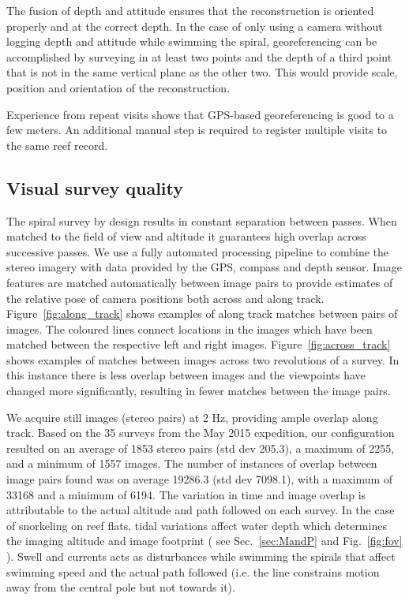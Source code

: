 The fusion of depth and attitude ensures that the reconstruction is oriented properly and at the correct depth. In the case of only using a camera without logging depth and attitude while swimming the spiral, georeferencing can be accomplished by surveying in at least two points and the depth of a third point that is not in the same vertical plane as the other two. This would provide scale, position and orientation of the reconstruction.

Experience from repeat visits shows that GPS-based georeferencing is good to a few meters. An additional manual step is required to register multiple visits to the same reef record.

\subsection{Visual survey quality}
The spiral survey by design results in constant separation between passes. When matched to the field of view and altitude it guarantees high overlap across successive passes. We use a fully automated processing pipeline to combine the stereo imagery with data provided by the GPS, compass and depth sensor.  Image features are matched automatically between image pairs to provide estimates of the relative pose of camera positions both across and along track.  Figure~\ref{fig:along_track} shows examples of along track matches between pairs of images.  The coloured lines connect locations in the images which have been matched between the respective left and right images.  Figure~\ref{fig:across_track} shows examples of matches between images across two revolutions of a survey.  In this instance there is less overlap between images and the viewpoints have changed more significantly, resulting in fewer matches between the image pairs.

We acquire still images (stereo pairs) at 2 Hz, providing ample overlap along track. Based on the 35 surveys from the May 2015 expedition, our configuration resulted on an average of 1853 stereo pairs (std dev 205.3), a maximum of 2255, and a minimum of 1557 images. The number of instances of overlap between image pairs found was on average 19286.3 (std dev 7098.1), with a maximum of 33168 and a minimum of 6194. The variation in time and image overlap is attributable to the actual altitude and path followed on each survey. In the case of snorkeling on reef flats, tidal variations affect water depth which determines the imaging altitude and image footprint ( see Sec.~\ref{sec:MandP} and Fig.~\ref{fig:fov} ). Swell and currents acts as disturbances while swimming the spirals that affect swimming speed and the actual path followed (i.e. the line constrains motion away from the central pole but not towards it). 

